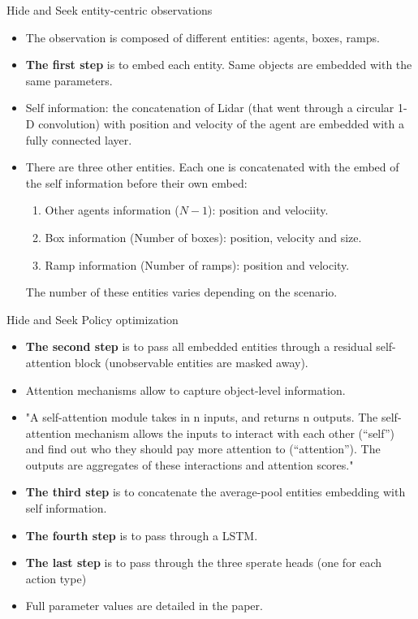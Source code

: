 \documentclass{beamer}
\begin{document}
\begin{frame}{Hide and Seek entity-centric observations}
\begin{itemize}
    \item The observation is composed of different entities: agents, boxes, ramps.
    \item \textbf{The first step} is to embed each entity. Same objects are embedded with the same parameters.
    \item Self information: the concatenation of Lidar (that went through a circular 1-D convolution) with position and velocity of the agent are embedded with a fully connected layer.
    \item There are three other entities. Each one is concatenated with the embed of the self information before their own embed:
    \begin{enumerate}
        \item Other agents information ($N-1$): position and velociity.
        \item Box information (Number of boxes): position, velocity and size.
        \item Ramp information (Number of ramps): position and velocity.
    \end{enumerate}
    The number of these entities varies depending on the scenario.
\end{itemize}{}
\end{frame}{}

\begin{frame}{Hide and Seek Policy optimization}
\begin{itemize}
    \item \textbf{The second step} is to pass all embedded entities through a residual self-attention block (unobservable entities are masked away).
    \item Attention mechanisms allow to capture object-level information.
    \item "A self-attention module takes in n inputs, and returns n outputs. The self-attention mechanism allows the inputs to interact with each other (“self”) and find out who they should pay more attention to (“attention”). The outputs are aggregates of these interactions and attention scores."
    \item \textbf{The third step} is to concatenate the average-pool entities embedding with self information.
    \item \textbf{The fourth step} is to pass through a LSTM.
    \item \textbf{The last step} is to pass through the three sperate heads (one for each action type)
    \item Full parameter values are detailed in the paper.
\end{itemize}{}
\end{frame}{}
\end{document}
